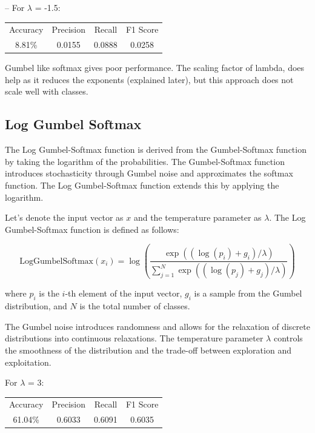 \documentclass{article}
\begin{document}
--
\vspace{6pt}
For \(\lambda\) = -1.5:

\begin{center}
\begin{tabular}{ |c|c|c|c| } 
 \hline
 Accuracy & Precision & Recall & F1 Score \\ 
 8.81\% & 0.0155 & 0.0888 & 0.0258 \\
 \hline
\end{tabular}
\end{center}

Gumbel like softmax gives poor performance. The scaling factor of lambda, does help as it reduces the exponents (explained later), but this approach does not scale well with classes.



\subsection{Log Gumbel Softmax}

The Log Gumbel-Softmax function is derived from the Gumbel-Softmax function by taking the logarithm of the probabilities. The Gumbel-Softmax function introduces stochasticity through Gumbel noise and approximates the softmax function. The Log Gumbel-Softmax function extends this by applying the logarithm.

Let's denote the input vector as \(x\) and the temperature parameter as \(\lambda\). The Log Gumbel-Softmax function is defined as follows:

\[
\text{LogGumbelSoftmax}(x_i) = \log\left(\frac{\exp((\log(p_i) + g_i)/\lambda)}{\sum_{j=1}^{N}\exp((\log(p_j) + g_j)/\lambda)}\right)
\]

where \(p_i\) is the \(i\)-th element of the input vector, \(g_i\) is a sample from the Gumbel distribution, and \(N\) is the total number of classes.

The Gumbel noise introduces randomness and allows for the relaxation of discrete distributions into continuous relaxations. The temperature parameter \(\lambda\) controls the smoothness of the distribution and the trade-off between exploration and exploitation.

\vspace{6pt}
For \(\lambda\) = 3:

\begin{center}
\begin{tabular}{ |c|c|c|c| } 
 \hline
 Accuracy & Precision & Recall & F1 Score \\ 
 61.04\% & 0.6033 & 0.6091 & 0.6035 \\
 \hline
\end{tabular}
\end{center}
\end{document}
